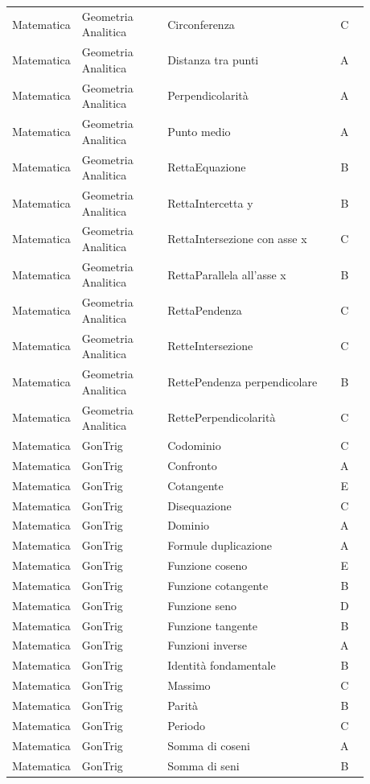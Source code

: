 \documentclass[20pt, a4paper]{article}
\begin{document}
\begin{longtable}{@{}>{\raggedright\arraybackslash}p{0.18\linewidth}>{\raggedright\arraybackslash}p{0.24\linewidth}>{\raggedright\arraybackslash}p{0.46\linewidth}c@{}}
Matematica & Geometria Analitica & Circonferenza & C \\
Matematica & Geometria Analitica & Distanza tra punti & A \\
Matematica & Geometria Analitica & Perpendicolarità & A \\
Matematica & Geometria Analitica & Punto medio & A \\
Matematica & Geometria Analitica & RettaEquazione & B \\
Matematica & Geometria Analitica & RettaIntercetta y & B \\
Matematica & Geometria Analitica & RettaIntersezione con asse x & C \\
Matematica & Geometria Analitica & RettaParallela all'asse x & B \\
Matematica & Geometria Analitica & RettaPendenza & C \\
Matematica & Geometria Analitica & RetteIntersezione & C \\
Matematica & Geometria Analitica & RettePendenza perpendicolare & B \\
Matematica & Geometria Analitica & RettePerpendicolarità & C \\
Matematica & GonTrig & Codominio & C \\
Matematica & GonTrig & Confronto & A \\
Matematica & GonTrig & Cotangente & E \\
Matematica & GonTrig & Disequazione & C \\
Matematica & GonTrig & Dominio & A \\
Matematica & GonTrig & Formule duplicazione & A \\
Matematica & GonTrig & Funzione coseno & E \\
Matematica & GonTrig & Funzione cotangente & B \\
Matematica & GonTrig & Funzione seno & D \\
Matematica & GonTrig & Funzione tangente & B \\
Matematica & GonTrig & Funzioni inverse & A \\
Matematica & GonTrig & Identità fondamentale & B \\
Matematica & GonTrig & Massimo & C \\
Matematica & GonTrig & Parità & B \\
Matematica & GonTrig & Periodo & C \\
Matematica & GonTrig & Somma di coseni & A \\
Matematica & GonTrig & Somma di seni & B \\

\end{longtable}
\end{document}
